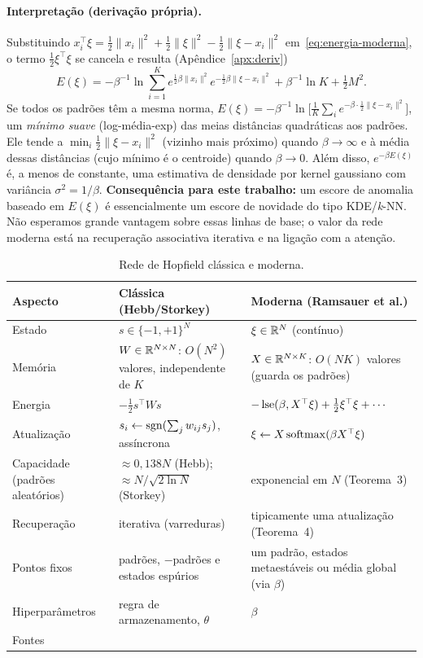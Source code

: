 \paragraph{Interpretação (derivação própria).} Substituindo $x_i^{\top}\xi=\tfrac12\|x_i\|^2+\tfrac12\|\xi\|^2-\tfrac12\|\xi-x_i\|^2$
em~\eqref{eq:energia-moderna}, o termo $\tfrac12\xi^\top\xi$ se cancela e resulta (Apêndice~\ref{apx:deriv})
\[
E(\xi)=-\beta^{-1}\ln\sum_{i=1}^{K}e^{\frac12\beta\|x_i\|^2}e^{-\frac12\beta\|\xi-x_i\|^2}+\beta^{-1}\ln K+\tfrac12M^2 .
\]
Se todos os padrões têm a mesma norma, $E(\xi)=-\beta^{-1}\ln\bigl[\tfrac1K\sum_ie^{-\beta\cdot\frac12\|\xi-x_i\|^2}\bigr]$,
um \emph{mínimo suave} (log-média-exp) das meias distâncias quadráticas aos padrões. Ele tende a
$\min_i\tfrac12\|\xi-x_i\|^2$ (vizinho mais próximo) quando $\beta\to\infty$ e à média dessas distâncias
(cujo mínimo é o centroide) quando $\beta\to0$. Além disso, $e^{-\beta E(\xi)}$ é, a menos de constante,
uma estimativa de densidade por kernel gaussiano com variância $\sigma^2=1/\beta$.
\textbf{Consequência para este trabalho:} um escore de anomalia baseado em $E(\xi)$ é essencialmente um escore
de novidade do tipo KDE/\emph{k}-NN. Não esperamos grande vantagem sobre essas linhas de base; o valor da rede
moderna está na recuperação associativa iterativa e na ligação com a atenção.

\begin{table}[htbp]
\centering
\caption{Rede de Hopfield clássica e moderna.}
\label{tab:comparacao}
\small
\begin{tabularx}{\textwidth}{@{}l L L@{}}
\toprule
Aspecto & Clássica (Hebb/Storkey) & Moderna (Ramsauer et al.)\\
\midrule
Estado & $s\in\{-1,+1\}^N$ & $\xi\in\mathbb{R}^N$ (contínuo)\\
Memória & $W\in\mathbb{R}^{N\times N}$: $O(N^2)$ valores, independente de $K$ & $X\in\mathbb{R}^{N\times K}$: $O(NK)$ valores (guarda os padrões)\\
Energia & $-\tfrac12s^\top Ws$ & $-\operatorname{lse}(\beta,X^\top\xi)+\tfrac12\xi^\top\xi+\cdots$\\
Atualização & $s_i\leftarrow\operatorname{sgn}(\sum_jw_{ij}s_j)$, assíncrona & $\xi\leftarrow X\operatorname{softmax}(\beta X^\top\xi)$\\
Capacidade (padrões aleatórios) & ${\approx}0{,}138N$ (Hebb); ${\approx}N/\sqrt{2\ln N}$ (Storkey) & exponencial em $N$ (Teorema~3)\\
Recuperação & iterativa (varreduras) & tipicamente uma atualização (Teorema~4)\\
Pontos fixos & padrões, $-$padrões e estados espúrios & um padrão, estados metaestáveis ou média global (via $\beta$)\\
Hiperparâmetros & regra de armazenamento, $\theta$ & $\beta$\\
Fontes & \cite{hopfield1982,storkey1997,wikihopfield} & \cite{ramsauer2021,krotov2016,demircigil2017}\\
\bottomrule
\end{tabularx}
\end{table}

